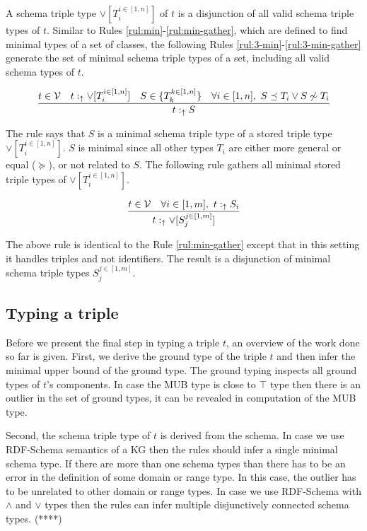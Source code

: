\documentclass[runningheads]{llncs}
\newcommand{\uarr}{\uparrow}
\newcommand{\V}{{\cal V}}
\begin{document}
A schema triple type $\lor[T_i^{i\in[1,n]}]$ of $t$ is a disjunction
of all valid schema triple types of $t$. Similar to Rules
\ref{rul:min}-\ref{rul:min-gather}, which are defined to find minimal
types of a set of classes, the following Rules
\ref{rul:3-min}-\ref{rul:3-min-gather} generate the set of minimal
schema triple types of a set, including all valid schema types of $t$.

\begin{equation}
\label{rul:3-min}
\dfrac{t\in\V\quad\/t:_\uarr\lor[T_i^{i\in[1,n]}]\quad\/S\in\/\{T_k^{k\in[1,n]}\}\quad\forall\/i\in[1,n],\ S\preceq\/T_i\lor\/S\not\sim\/T_i}
      {t:_{\uarr}S}
\end{equation}

The rule says that $S$ is a minimal schema triple type of a stored
triple type $\lor[T_i^{i\in[1,n]}]$. $S$ is minimal since all other
types $T_i$ are either more general or equal ($\succeq$), or not
related to $S$. The following rule gathers all minimal stored triple
types of $\lor[T_i^{i\in[1,n]}]$.

\begin{equation}
\label{rul:3-min-gather}
\dfrac{t\in\V\quad\forall\/i\in[1,m],\ t:_\uarr\/S_i}
      {t:_{\uarr}\lor[S_j^{j\in[1,m]}]}
\end{equation}

The above rule is identical to the Rule \ref{rul:min-gather} except
that in this setting it handles triples and not identifiers. The
result is a disjunction of minimal schema triple types $S_j^{j\in[1,m]}$.






\subsection{Typing a triple}

Before we present the final step in typing a triple $t$, an overview
of the work done so far is given. First, we derive the ground type of
the triple $t$ and then infer the minimal upper bound of the ground
type. The ground typing inspects all ground types of $t$'s
components. In case the MUB type is close to $\top$ type then there is
an outlier in the set of ground types, it can be revealed in
computation of the MUB type. 

Second, the schema triple type of $t$ is derived from the schema. In
case we use RDF-Schema semantics of a KG then the rules should infer a
single minimal schema type. If there are more than one schema types
than there has to be an error in the definition of some domain or
range type. In this case, the outlier has to be unrelated to other
domain or range types. In case we use RDF-Schema with $\land$ and
$\lor$ types then the rules can infer multiple disjunctively connected
schema types. (****)
\end{document}
